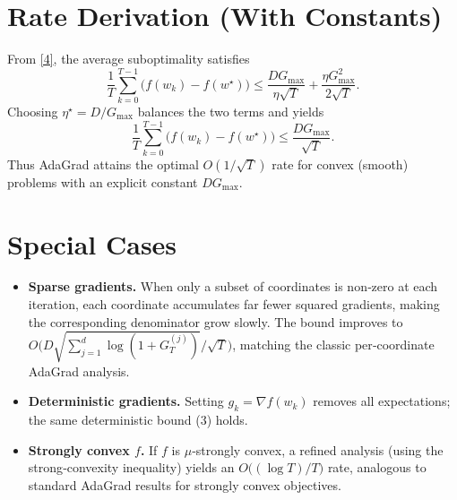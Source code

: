 \documentclass[11pt]{article}
\begin{document}
\section*{Rate Derivation (With Constants)}
From \eqref{4}, the average suboptimality satisfies
\[
\frac{1}{T}\sum_{k=0}^{T-1}\bigl(f(w_k)-f(w^{\star})\bigr)
\le
\frac{DG_{\max}}{\eta\sqrt{T}}+\frac{\eta G_{\max}^{2}}{2\sqrt{T}} .
\]
Choosing $\eta^{\star}=D/G_{\max}$ balances the two terms and yields
\[
\frac{1}{T}\sum_{k=0}^{T-1}\bigl(f(w_k)-f(w^{\star})\bigr)
\le
\frac{DG_{\max}}{\sqrt{T}} .
\]
Thus AdaGrad attains the optimal $O(1/\sqrt{T})$ rate for convex (smooth) problems with an explicit constant $DG_{\max}$.

\section*{Special Cases}
\begin{itemize}
\item \textbf{Sparse gradients.} When only a subset of coordinates is non‑zero at each iteration, each coordinate accumulates far fewer squared gradients, making the corresponding denominator grow slowly. The bound improves to $O\!\bigl(D\sqrt{\sum_{j=1}^{d}\log(1+G_{T}^{(j)})}/\sqrt{T}\bigr)$, matching the classic per‑coordinate AdaGrad analysis.
\item \textbf{Deterministic gradients.} Setting $g_k=\nabla f(w_k)$ removes all expectations; the same deterministic bound (3) holds.
\item \textbf{Strongly convex $f$.} If $f$ is $\mu$‑strongly convex, a refined analysis (using the strong‑convexity inequality) yields an $O\bigl((\log T)/T\bigr)$ rate, analogous to standard AdaGrad results for strongly convex objectives.
\end{itemize}
\end{document}
